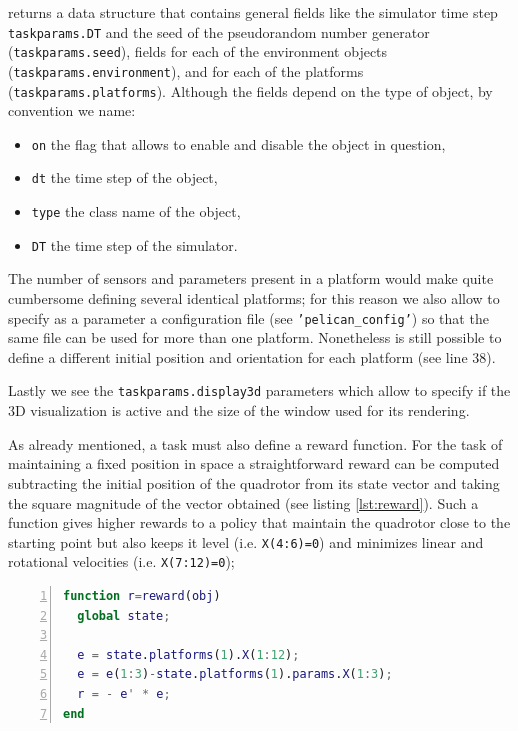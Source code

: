 \documentclass[a4paper,11pt]{report}
\begin{document}
returns a data structure that contains general fields like the simulator time step \texttt{taskparams.DT} and the seed of the pseudorandom number generator (\texttt{taskparams.seed}), fields for each of the environment objects (\texttt{taskparams.environment}), and for each of the platforms (\texttt{taskparams.platforms}). Although the fields depend on the type of object, by convention we name:
\begin{itemize}
\item \texttt{on} the flag that allows to enable and disable the object in question,
\item \texttt{dt} the time step of the object,
\item \texttt{type} the class name of the object,
\item \texttt{DT} the time step of the simulator.
\end{itemize}
The number of sensors and parameters present in a platform would make quite cumbersome defining several identical platforms; for this reason we also allow to specify as a parameter a configuration file (see \texttt{'pelican\_config'}) so that the same file can be used for more than one platform. Nonetheless is still possible to define a different initial position and orientation for each platform (see line 38).

Lastly we see the \texttt{taskparams.display3d} parameters which allow to specify if the 3D visualization is active and the size of the window used for its rendering. 

As already mentioned, a task must also define a reward function. For the task of maintaining a fixed position in space a straightforward reward can be computed subtracting the initial position of the quadrotor from its state vector and taking the square magnitude of the vector obtained (see listing \ref{lst:reward}). 
Such a function gives higher rewards to a policy that maintain the quadrotor close to the starting point but also keeps it level (i.e. \texttt{X(4:6)=0}) and minimizes linear and rotational velocities (i.e. \texttt{X(7:12)=0});

\begin{lstlisting}[float=ht!bp,caption=KeepSpot reward() method,language=Matlab,frame=lines,label=lst:reward,numbers=left,basicstyle=\small]
function r=reward(obj)
  global state;

  e = state.platforms(1).X(1:12);
  e = e(1:3)-state.platforms(1).params.X(1:3);
  r = - e' * e; 
end
\end{lstlisting}
\end{document}
